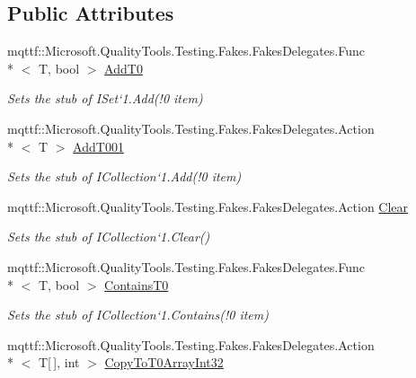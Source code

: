 \subsection*{Public Attributes}
\begin{DoxyCompactItemize}
\item 
mqttf\-::\-Microsoft.\-Quality\-Tools.\-Testing.\-Fakes.\-Fakes\-Delegates.\-Func\\*
$<$ T, bool $>$ \hyperlink{class_system_1_1_collections_1_1_generic_1_1_fakes_1_1_stub_i_set_3_01_t_01_4_a7d952e6fb63546a52ff5bea1ed286522}{Add\-T0}
\begin{DoxyCompactList}\small\item\em Sets the stub of I\-Set`1.Add(!0 item)\end{DoxyCompactList}\item 
mqttf\-::\-Microsoft.\-Quality\-Tools.\-Testing.\-Fakes.\-Fakes\-Delegates.\-Action\\*
$<$ T $>$ \hyperlink{class_system_1_1_collections_1_1_generic_1_1_fakes_1_1_stub_i_set_3_01_t_01_4_ab52f869cd1021cca54d6620e049ba972}{Add\-T001}
\begin{DoxyCompactList}\small\item\em Sets the stub of I\-Collection`1.Add(!0 item)\end{DoxyCompactList}\item 
mqttf\-::\-Microsoft.\-Quality\-Tools.\-Testing.\-Fakes.\-Fakes\-Delegates.\-Action \hyperlink{class_system_1_1_collections_1_1_generic_1_1_fakes_1_1_stub_i_set_3_01_t_01_4_a1ea7e98aa37ac9ace87c5d1caeb34ade}{Clear}
\begin{DoxyCompactList}\small\item\em Sets the stub of I\-Collection`1.Clear()\end{DoxyCompactList}\item 
mqttf\-::\-Microsoft.\-Quality\-Tools.\-Testing.\-Fakes.\-Fakes\-Delegates.\-Func\\*
$<$ T, bool $>$ \hyperlink{class_system_1_1_collections_1_1_generic_1_1_fakes_1_1_stub_i_set_3_01_t_01_4_a0e3a8d125585affa24271d7e10eccd99}{Contains\-T0}
\begin{DoxyCompactList}\small\item\em Sets the stub of I\-Collection`1.Contains(!0 item)\end{DoxyCompactList}\item 
mqttf\-::\-Microsoft.\-Quality\-Tools.\-Testing.\-Fakes.\-Fakes\-Delegates.\-Action\\*
$<$ T\mbox{[}$\,$\mbox{]}, int $>$ \hyperlink{class_system_1_1_collections_1_1_generic_1_1_fakes_1_1_stub_i_set_3_01_t_01_4_a0201d36a56ffce541378bd87bcfdb0e8}{Copy\-To\-T0\-Array\-Int32}

\end{DoxyCompactItemize}
